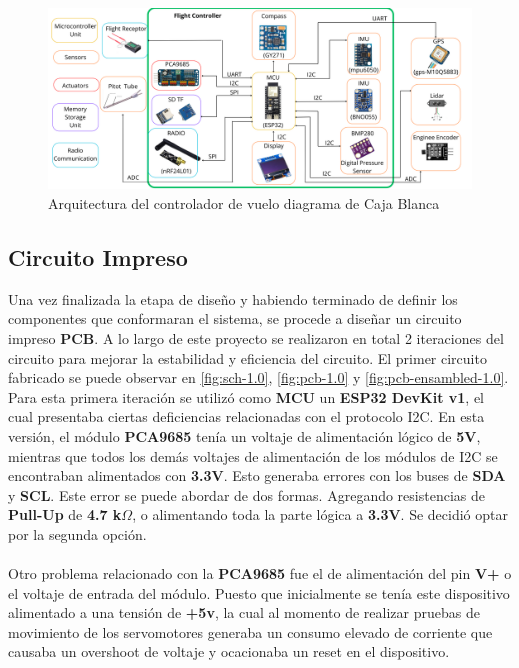 \begin{figure}[H]
    \centering
    \includegraphics[width=\textwidth]{Imagenes/Metodologia/arquitecturaModulos.png}
    \caption{Arquitectura del controlador de vuelo diagrama de Caja Blanca }
    \label{fig:arqui_Blanxa}
\end{figure}

\subsection{Circuito Impreso}
Una vez finalizada la etapa de diseño y habiendo terminado de definir los componentes que conformaran el sistema, se procede a diseñar un circuito impreso \textbf{PCB}. A lo largo de este proyecto se realizaron en total 2 iteraciones del circuito para mejorar la estabilidad y eficiencia del circuito. El primer circuito fabricado se puede observar en \ref{fig:sch-1.0}, \ref{fig:pcb-1.0} y \ref{fig:pcb-ensambled-1.0}. Para esta primera iteración se utilizó como \textbf{MCU} un \textbf{ESP32 DevKit v1}, el cual presentaba ciertas deficiencias relacionadas con el protocolo I2C. En esta versión, el módulo \textbf{PCA9685} tenía un voltaje de alimentación lógico de \textbf{5V}, mientras que todos los demás voltajes de alimentación de los módulos de I2C se encontraban alimentados con \textbf{3.3V}. Esto generaba errores con los buses de \textbf{SDA} y \textbf{SCL}. Este error se puede abordar de dos formas. Agregando resistencias de \textbf{Pull-Up} de \textbf{4.7 k$\Omega$}, o alimentando toda la parte lógica a \textbf{3.3V}. Se decidió optar por la segunda opción. \\ \\
    


Otro problema relacionado con la \textbf{PCA9685} fue el de alimentación del pin \textbf{V+} o el voltaje de entrada del módulo. Puesto que inicialmente se tenía este dispositivo alimentado a una tensión de \textbf{+5v}, la cual al momento de realizar pruebas de movimiento de los servomotores generaba un consumo elevado de corriente que causaba un overshoot de voltaje y ocacionaba un reset en el dispositivo. 


